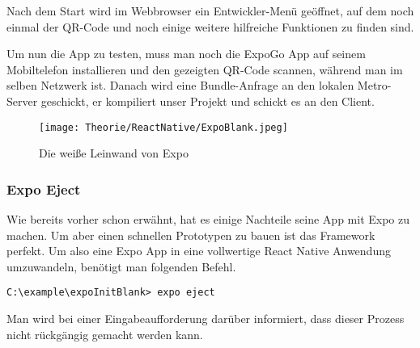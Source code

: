 Nach dem Start wird im Webbrowser ein Entwickler-Menü geöffnet, auf dem noch einmal der QR-Code
und noch einige weitere hilfreiche Funktionen zu finden sind.

Um nun die App zu testen, muss man noch die ExpoGo App auf seinem Mobiltelefon installieren und den
gezeigten QR-Code scannen, während man im selben Netzwerk ist. Danach wird eine Bundle-Anfrage an
den lokalen Metro-Server geschickt, er kompiliert unser Projekt und schickt es an den Client.

\begin{figure}[H]
  \begin{center}
    \texttt{[image: Theorie/ReactNative/ExpoBlank.jpeg]}
    \caption{Die weiße Leinwand von Expo}
  \end{center}
\end{figure}

\subsubsection{Expo Eject}
Wie bereits vorher schon erwähnt, hat es einige Nachteile seine App mit Expo zu machen. Um aber
einen schnellen Prototypen zu bauen ist das Framework perfekt. Um also eine Expo App in eine
vollwertige React Native Anwendung umzuwandeln, benötigt man folgenden Befehl.

\begin{lstlisting}
C:\example\expoInitBlank> expo eject
\end{lstlisting}

Man wird bei einer Eingabeaufforderung darüber informiert, dass dieser Prozess nicht rückgängig
gemacht werden kann.